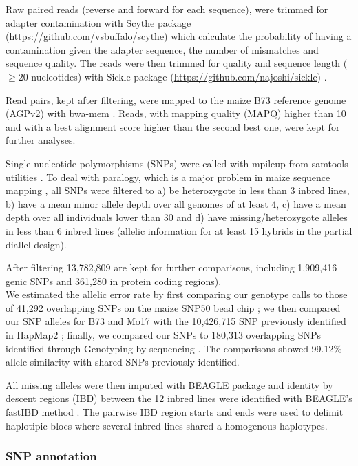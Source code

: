 \documentclass[10pt]{article}
\begin{document}
Raw paired reads (reverse and forward for each sequence), were trimmed for adapter contamination with Scythe package (\url{https://github.com/vsbuffalo/scythe}) which calculate the probability of having a contamination given the adapter sequence, the number of mismatches and sequence quality. The reads were then trimmed for quality and sequence length ($\geq 20$ nucleotides) with Sickle package (\url{https://github.com/najoshi/sickle}) .

Read pairs, kept after filtering,  were mapped to the maize B73 reference genome (AGPv2) with bwa-mem \citep{Li2009B}. Reads, with mapping quality (MAPQ) higher than 10 and with a best alignment score higher than the second best one, were kept for further analyses.

Single nucleotide polymorphisms (SNPs) were called with mpileup from samtools utilities \citep{Li2009}. To deal with paralogy, which is a major problem in maize sequence mapping \citep{Chia2012}, all SNPs were filtered to a) be heterozygote in less than 3 inbred lines, b) have a mean minor allele depth over all genomes of at least 4, c) have a mean depth over all individuals lower than 30 and d) have missing/heterozygote alleles in less than 6 inbred lines (allelic information for at least 15 hybrids in the partial diallel design). 

After filtering 13,782,809 are kept for further comparisons, including 1,909,416 genic SNPs and 361,280 in protein coding regions). \\
We estimated the allelic error rate by first comparing our genotype calls to those of 41,292 overlapping SNPs on the maize SNP50 bead chip \citep{Heerwaarden2012};  we then compared our SNP alleles for B73 and Mo17 with the 10,426,715 SNP previously identified in HapMap2 \citep{Chia2012}; finally, we compared our SNPs to 180,313 overlapping SNPs identified through Genotyping by sequencing \citep{Romay2013}. The comparisons showed 99.12\% allele similarity with shared SNPs previously identified. 

All missing alleles were then imputed with BEAGLE package \citep{Browning2009} and identity by descent regions (IBD) between the 12 inbred lines were identified with BEAGLE's fastIBD method \citep{Browning2011}. The pairwise IBD region starts and ends were used to delimit haplotipic blocs where several inbred lines shared a homogenous haplotypes.%
\subsubsection*{SNP annotation}
\end{document}
